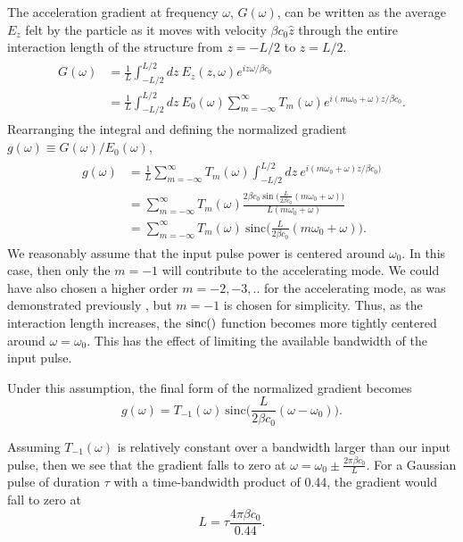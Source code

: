 The acceleration gradient at frequency $\omega$, $G(\omega)$, can be written as the average $E_z$ felt by the particle as it moves with velocity $\beta c_0 \hat{z}$ through the entire interaction length of the structure from $z= -L/2$ to $z=L/2$.
\begin{align}
\begin{split}
G(\omega) &= \frac{1}{L}\int_{-L/2}^{L/2}dz\ E_z(z,\omega) e^{i z \omega / \beta c_0} \\
         &= \frac{1}{L}\int_{-L/2}^{L/2}dz\ E_0(\omega) \sum_{m=-\infty}^{\infty} T_m(\omega) e^{i (m\omega_0+\omega) z / \beta c_0}. 
\end{split}
\end{align}
Rearranging the integral and defining the normalized gradient $g(\omega) \equiv G(\omega)/E_0(\omega)$,
\begin{align}
\begin{split}
g(\omega) &= \frac{1}{L} \sum_{m=-\infty}^{\infty} T_m(\omega) \int_{-L/2}^{L/2}dz\ e^{i (m\omega_0+\omega) z / \beta c_0)}\\ 
 &= \sum_{m=-\infty}^{\infty} T_m(\omega) \frac{2\beta c_0 \sin\Big(\frac{L}{2\beta c_0}(m\omega_0+\omega)\Big)}{L(m\omega_0+\omega)}\\
 &= \sum_{m=-\infty}^{\infty} T_m(\omega) \ 
 \textrm{sinc} \Big( \frac{L}{2\beta c_0}(m\omega_0+\omega) \Big).
 \end{split}
\end{align}
We reasonably assume that the input pulse power is centered around $\omega_0$. In this case, then only the $m=-1$ will contribute to the accelerating mode. We could have also chosen a higher order $m = -2,-3,..$ for the accelerating mode, as was demonstrated previously \cite{breuer2013laser, mcneur2016laser}, but $m=-1$ is chosen for simplicity. Thus, as the interaction length increases, the $\rm{sinc}()$ function becomes more tightly centered around $\omega = \omega_0$. This has the effect of limiting the available bandwidth of the input pulse.

Under this assumption, the final form of the normalized gradient becomes
\begin{equation}
 g(\omega) = T_{-1}(\omega) \ 
 \textrm{sinc} \Big( \frac{L}{2\beta c_0}(\omega-\omega_0) \Big).
\label{eq:finiteLength}
\end{equation}

Assuming $T_{-1}(\omega)$ is relatively constant over a bandwidth larger than our input pulse, then we see that the gradient falls to zero at $\omega = \omega_0 \pm \frac{2\pi\beta c_0}{L}$. For a Gaussian pulse of duration $\tau$ with a time-bandwidth product of 0.44, the gradient would fall to zero at 
\begin{equation}
L = \tau \frac{4\pi\beta c_0}{0.44}.
\label{eq:L_tau}
\end{equation}

